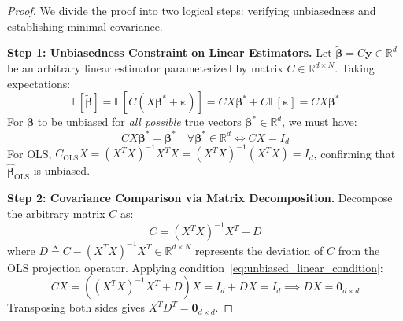 \begin{proof}
We divide the proof into two logical steps: verifying unbiasedness and establishing minimal covariance.

\textbf{Step 1: Unbiasedness Constraint on Linear Estimators.}
Let $\tilde{\boldsymbol{\beta}} = C \mathbf{y} \in \mathbb{R}^d$ be an arbitrary linear estimator parameterized by matrix $C \in \mathbb{R}^{d \times N}$. Taking expectations:
\begin{equation}
\mathbb{E}[\tilde{\boldsymbol{\beta}}] = \mathbb{E}[C(X\boldsymbol{\beta}^* + \boldsymbol{\varepsilon})] = C X \boldsymbol{\beta}^* + C \mathbb{E}[\boldsymbol{\varepsilon}] = C X \boldsymbol{\beta}^*
\end{equation}
For $\tilde{\boldsymbol{\beta}}$ to be unbiased for \emph{all possible} true vectors $\boldsymbol{\beta}^* \in \mathbb{R}^d$, we must have:
\begin{equation}
C X \boldsymbol{\beta}^* = \boldsymbol{\beta}^* \quad \forall \boldsymbol{\beta}^* \in \mathbb{R}^d \iff C X = I_d
\label{eq:unbiased_linear_condition}
\end{equation}
For OLS, $C_{\mathrm{OLS}} X = (X^T X)^{-1} X^T X = (X^T X)^{-1}(X^T X) = I_d$, confirming that $\hat{\boldsymbol{\beta}}_{\mathrm{OLS}}$ is unbiased.

\textbf{Step 2: Covariance Comparison via Matrix Decomposition.}
Decompose the arbitrary matrix $C$ as:
\begin{equation}
C = (X^T X)^{-1} X^T + D
\end{equation}
where $D \triangleq C - (X^T X)^{-1} X^T \in \mathbb{R}^{d \times N}$ represents the deviation of $C$ from the OLS projection operator.
Applying condition~\eqref{eq:unbiased_linear_condition}:
\begin{equation}
C X = \left( (X^T X)^{-1} X^T + D \right) X = I_d + D X = I_d \implies D X = \mathbf{0}_{d \times d}
\label{eq:dx_zero}
\end{equation}
Transposing both sides gives $X^T D^T = \mathbf{0}_{d \times d}$.


\end{proof}
